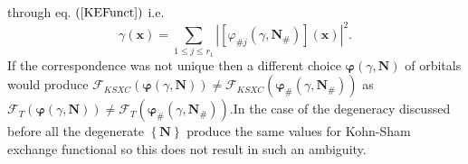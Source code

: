 \documentclass[aps,preprint]{revtex4}%
\begin{document}
through eq. $\left(  \ref{KEFunct}\right)  $ i.e.
\begin{equation}
\gamma\left(  \mathbf{x}\right)  =\sum_{1\leq j\leq r_{1}}\left\vert \left[
\varphi_{\#j}\left(  \gamma,\mathbf{N}_{\#}\right)  \right]  \left(
\mathbf{x}\right)  \right\vert ^{2}.
\end{equation}
If the correspondence was not unique then a different choice $\mathbf{\varphi
}\left(  \gamma,\mathbf{N}\right)  $ of orbitals would produce $\mathcal{F}%
_{KSXC}\left(  \mathbf{\varphi}\left(  \gamma,\mathbf{N}\right)  \right)
\neq\mathcal{F}_{KSXC}\left(  \mathbf{\varphi}_{\#}\left(  \gamma
,\mathbf{N}_{\#}\right)  \right)  $ as $\mathcal{F}_{T}\left(  \mathbf{\varphi
}\left(  \gamma,\mathbf{N}\right)  \right)  \neq\mathcal{F}_{T}\left(
\mathbf{\varphi}_{\#}\left(  \gamma,\mathbf{N}_{\#}\right)  \right)  .$In the
case of the degeneracy discussed before all the degenerate $\left\{
\mathbf{N}\right\}  $ produce the same values for Kohn-Sham exchange
functional so this does not result in such an ambiguity.
\end{document}
